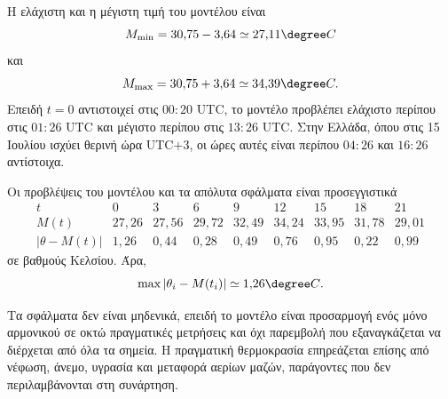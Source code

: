 \begin{alist}
        Η ελάχιστη και η μέγιστη τιμή του μοντέλου είναι
        \[
          M_{\min}=30{,}75-3{,}64
          \simeq27{,}11\degree C
        \]
        και
        \[
          M_{\max}=30{,}75+3{,}64
          \simeq34{,}39\degree C.
        \]
        Επειδή $t=0$ αντιστοιχεί στις $00{:}20$ UTC, το μοντέλο
        προβλέπει ελάχιστο περίπου στις $01{:}26$ UTC και μέγιστο περίπου
        στις $13{:}26$ UTC. Στην Ελλάδα, όπου στις 15 Ιουλίου ισχύει
        θερινή ώρα UTC$+3$, οι ώρες αυτές είναι περίπου $04{:}26$ και
        $16{:}26$ αντίστοιχα.

  \item Οι προβλέψεις του μοντέλου και τα απόλυτα σφάλματα είναι
        προσεγγιστικά
        \[
        \begin{array}{c|cccccccc}
          t&0&3&6&9&12&15&18&21\\ \hline
          M(t)&27{,}26&27{,}56&29{,}72&32{,}49&
                34{,}24&33{,}95&31{,}78&29{,}01\\
          |\theta-M(t)|
              &1{,}26&0{,}44&0{,}28&0{,}49&
               0{,}76&0{,}95&0{,}22&0{,}99
        \end{array}
        \]
        σε βαθμούς Κελσίου. Άρα,
        \[
          {\max|\theta_i-M(t_i)|\simeq1{,}26\degree C}.
        \]

        Τα σφάλματα δεν είναι μηδενικά, επειδή το μοντέλο είναι
        προσαρμογή ενός μόνο αρμονικού σε οκτώ πραγματικές μετρήσεις και
        όχι παρεμβολή που εξαναγκάζεται να διέρχεται από όλα τα σημεία.
        Η πραγματική θερμοκρασία επηρεάζεται επίσης από νέφωση, άνεμο,
        υγρασία και μεταφορά αερίων μαζών, παράγοντες που δεν
        περιλαμβάνονται στη συνάρτηση.
\end{alist}
